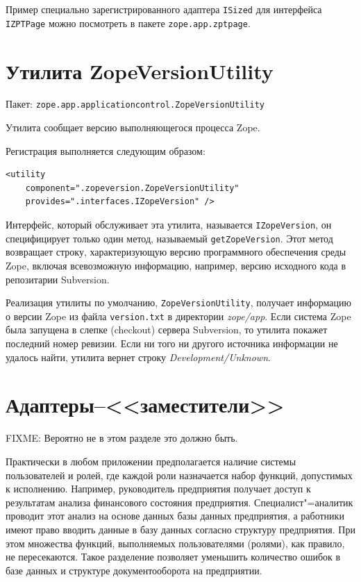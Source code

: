 \documentclass[a4paper,openany,twoside,draft]{book}
\providecommand*{\DUroletitlereference}[1]{\textsl{#1}}
\begin{document}
Пример специально зарегистрированного адаптера \texttt{ISized} для интерфейса \texttt{IZPTPage} можно посмотреть в пакете \texttt{zope.app.zptpage}.


\section{Утилита ZopeVersionUtility%
  \label{zopeversionutility}%
}

Пакет: \texttt{zope.app.applicationcontrol.ZopeVersionUtility}

Утилита сообщает версию выполняющегося процесса Zope.

Регистрация выполняется следующим образом:

\begin{verbatim}
<utility
    component=".zopeversion.ZopeVersionUtility"
    provides=".interfaces.IZopeVersion" />
\end{verbatim}

Интерфейс, который обслуживает эта утилита, называется \texttt{IZopeVersion}, он специфицирует только один метод, называемый \texttt{getZopeVersion}.  Этот метод возвращает строку, характеризующую версию программного обеспечения среды Zope, включая всевозможную информацию, например, версию исходного кода в репозитарии Subversion.

Реализация утилиты по умолчанию, \texttt{ZopeVersionUtility}, получает информацию о версии Zope из файла \texttt{version.txt} в директории \DUroletitlereference{zope/app}.  Если система Zope была запущена в слепке (checkout) сервера Subversion, то утилита покажет последний номер ревизии.  Если ни того ни другого источника информации не удалось найти, утилита вернет строку \DUroletitlereference{Development/Unknown}.

\section{Адаптеры--<<заместители>>}
\label{sec:proxyadapters}

FIXME: Вероятно не в этом разделе это должно быть.

Практически в любом приложении предполагается наличие системы пользователей и ролей, где каждой роли назначается набор функций, допустимых к исполнению.  Например, руководитель предприятия получает доступ к результатам анализа финансового состояния предприятия.  Специалист"=аналитик проводит этот анализ на основе данных базы данных предприятия, а работники имеют право вводить данные в базу данных согласно структуру предприятия.  При этом множества функций, выполняемых пользователями (ролями), как правило, не пересекаются.  Такое разделение позволяет уменьшить количество ошибок в базе данных и структуре документооборота на предприятии.
\end{document}
